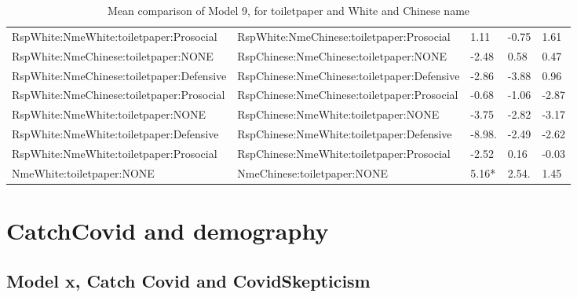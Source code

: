 \documentclass[]{report}
\begin{document}
\begin{table}[ht]
{\begin{tabular}{lllll}
		RspWhite:NmeWhite:toiletpaper:Prosocial  &  RspWhite:NmeChinese:toiletpaper:Prosocial & 1.11 & -0.75 & 1.61 \\ 
		RspWhite:NmeChinese:toiletpaper:NONE  &  RspChinese:NmeChinese:toiletpaper:NONE & -2.48 & 0.58 & 0.47 \\ 
		RspWhite:NmeChinese:toiletpaper:Defensive  &  RspChinese:NmeChinese:toiletpaper:Defensive & -2.86 & -3.88 & 0.96 \\ 
		RspWhite:NmeChinese:toiletpaper:Prosocial  &  RspChinese:NmeChinese:toiletpaper:Prosocial & -0.68 & -1.06 & -2.87 \\ 
		RspWhite:NmeWhite:toiletpaper:NONE  &  RspChinese:NmeWhite:toiletpaper:NONE & -3.75 & -2.82 & -3.17 \\ 
		RspWhite:NmeWhite:toiletpaper:Defensive  &  RspChinese:NmeWhite:toiletpaper:Defensive & -8.98. & -2.49 & -2.62 \\ 
		RspWhite:NmeWhite:toiletpaper:Prosocial  &  RspChinese:NmeWhite:toiletpaper:Prosocial & -2.52 & 0.16 & -0.03 \\ 
		NmeWhite:toiletpaper:NONE  &  NmeChinese:toiletpaper:NONE & 5.16* & 2.54. & 1.45 \\ 
		\hline
	\end{tabular}}
	\caption{Mean comparison of Model 9, for  toiletpaper  and White and Chinese name} 
\end{table}




\part{CatchCovid and demography}

\chapter{Model x, Catch Covid and CovidSkepticism}
\end{document}

